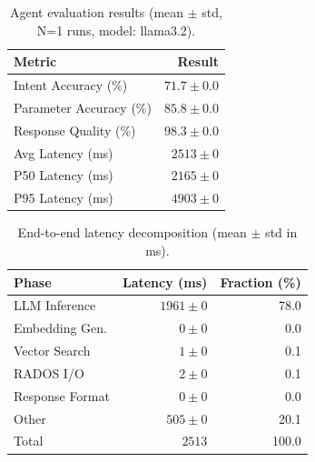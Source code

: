 
\begin{table}[t]
\centering
\caption{Agent evaluation results (mean $\pm$ std, N=1 runs, model: llama3.2).}
\label{tab:eval-results}
\begin{tabular}{lr}
\toprule
\textbf{Metric} & \textbf{Result} \\
\midrule
Intent Accuracy (\%) & $71.7 \pm 0.0$ \\
Parameter Accuracy (\%) & $85.8 \pm 0.0$ \\
Response Quality (\%) & $98.3 \pm 0.0$ \\
\midrule
Avg Latency (ms) & $2513 \pm 0$ \\
P50 Latency (ms) & $2165 \pm 0$ \\
P95 Latency (ms) & $4903 \pm 0$ \\
\bottomrule
\end{tabular}
\end{table}


\begin{table}[t]
\centering
\caption{End-to-end latency decomposition (mean $\pm$ std in ms).}
\label{tab:latency-decomp}
\begin{tabular}{lrr}
\toprule
\textbf{Phase} & \textbf{Latency (ms)} & \textbf{Fraction (\%)} \\
\midrule
LLM Inference & $1961 \pm 0$ & 78.0 \\
Embedding Gen. & $0 \pm 0$ & 0.0 \\
Vector Search & $1 \pm 0$ & 0.1 \\
RADOS I/O & $2 \pm 0$ & 0.1 \\
Response Format & $0 \pm 0$ & 0.0 \\
Other & $505 \pm 0$ & 20.1 \\
\midrule
Total & $2513$ & 100.0 \\
\bottomrule
\end{tabular}
\end{table}
